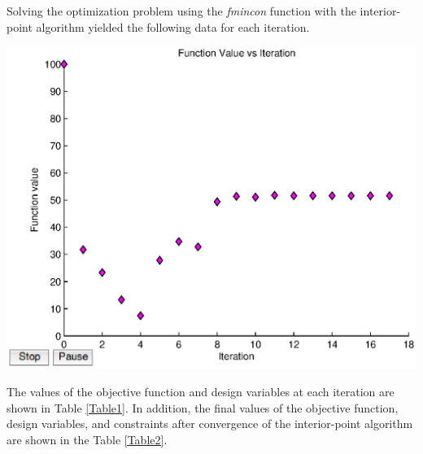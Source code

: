 \documentclass[11pt]{article}
\begin{document}

\begin{problem}{1}
\end{problem}
\begin{solution}

\end{solution}
Solving the optimization problem using the \emph{fmincon} function with the interior-point algorithm yielded the following data for each iteration.

\begin{center}
\includegraphics[scale=0.75]{problem1/problem1.eps}
\end{center}

The values of the objective function and design variables at each iteration are shown in Table \ref{Table1}. In addition, the final values of the objective function, design variables, and constraints after convergence of the interior-point algorithm are shown in the Table \ref{Table2}.
\end{document}

